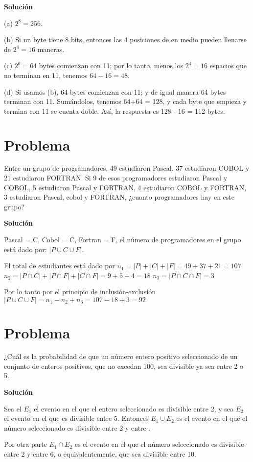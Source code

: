 \documentclass[12pt]{article}
\begin{document}
\textbf{Solución}\

(a) $2^8 = 256$.

(b) Si un byte tiene 8 bits, entonces las 4 posiciones de en medio pueden
llenarse de $2^4 = 16$ maneras. 

(c) $2^6 = 64$ bytes comienzan con 11; por lo tanto, menos los $2^4 = 16$
espacios que no terminan en 11, tenemos $64 - 16 = 48$.

(d) Si usamos (b), 64 bytes comienzan con 11; y de igual manera 64 bytes
terminan con 11. Sumándolos, tenemos 64+64 = 128, y cada byte que empieza y
termina con 11 se cuenta doble. Así, la respuesta es 128 - 16 = 112 bytes. 

\section{Problema}
Entre un grupo de programadores, 49 estudiaron Pascal. 37 estudiaron COBOL y 21
estudiaron FORTRAN. Si 9 de esos programadores estudiaron Pascal y COBOL, 5
estudiaron Pascal y FORTRAN, 4 estudiaron COBOL y FORTRAN, 3 estudiaron Pascal,
cobol y FORTRAN, ¿cuanto programadores hay en este grupo?

\textbf{Solución}

Pascal = C, Cobol = C, Fortran = F, el número de programadores en el grupo está
dado por: $|P \cup C \cup F|$.

El total de estudiantes está dado por $n_1 = |P|+|C|+|F| = 49+37+21=107$ $n_2
=|P \cap C| + |P \cap F| + |C \cap F| = 9+5+4 = 18$ $n_3 = |P \cap C \cap F| =
3$

Por lo tanto por el principio de inclusión-exclusión $|P \cup C \cup F| = n_1 - n_2 +
n_3 = 107-18+3 = 92$

\section{Problema}
¿Cuál es la probabilidad de que un número entero positivo seleccionado de un
conjunto de enteros positivos, que no excedan 100, sea divisible ya sea entre 2
o 5. 

\textbf{Solución}

Sea el $E_1$ el evento en el que el entero seleccionado es divisible entre 2, y
sea $E_2$ el evento en el que es divisible entre 5. Entonces $E_1 \cup E_2$ es
el evento en el que el número seleccionado es divisible entre 2 y entre .

Por otra parte $E_1 \cap E_2$ es el evento en el que el número seleccionado es
divisible entre 2 y entre 6, o equivalentemente, que sea divisible entre 10.
\end{document}
